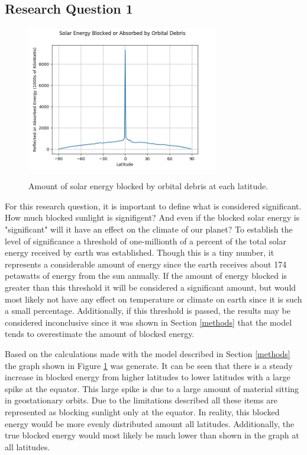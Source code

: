 \documentclass[11pt]{article}
\begin{document}
\begin{multicols*}{2}
\subsection{Research Question 1}
\begin{figure}[!tbp]
\caption{Amount of solar energy blocked by orbital debris at each latitude.}
\centering
\includegraphics[width=0.75\textwidth]{BlockedSolarEnergy.png}
\label{fig:blockedSunlight}
\end{figure}
For this research question, it is important to define what is considered significant. How much blocked sunlight is signifigent? And even if the blocked solar energy is "significant" will it have an effect on the climate of our planet? To establish the level of significance a threshold of one-millionth of a percent of the total solar energy received by earth was established. Though this is a tiny number, it represents a considerable amount of energy since the earth receives about 174 petawatts of energy from the sun annually. If the amount of energy blocked is greater than this threshold it will be considered a significant amount, but would most likely not have any effect on temperature or climate on earth since it is such a small percentage. Additionally, if this threshold is passed, the results may be considered inconclusive since it was shown in Section \ref{methods} that the model tends to overestimate the amount of blocked energy.

Based on the calculations made with the model described in Section \ref{methods} the graph shown in Figure \ref{fig:blockedSunlight} was generate. It can be seen that there is a steady increase in blocked energy from higher latitudes to lower latitudes with a large spike at the equator. This large spike is due to a large amount of material sitting in geostationary orbits. Due to the limitations described all these items are represented as blocking sunlight only at the equator. In reality, this blocked energy would be more evenly distributed amount all latitudes. Additionally, the true blocked energy would most likely be much lower than shown in the graph at all latitudes. 


\end{multicols*}
\end{document}
